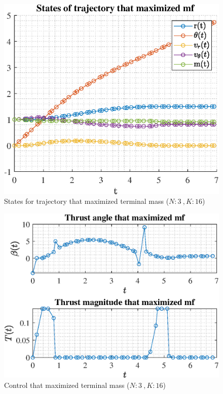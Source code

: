 \documentclass[]{article}
\begin{document}
	\begin{figure}
		\centering
		\includegraphics[scale=0.75]{states_N3_K16_C3_mf.eps}
		\caption{States for trajectory that maximized terminal mass (\(N:3\ , K:16\))}
		\label{fig:states_N3_K16_C3_mf}
	\end{figure}
	\begin{figure}
		\centering
		\includegraphics[scale=0.75]{control_N3_K16_C3_mf.eps}
		\caption{Control that maximized terminal mass (\(N:3\ , K:16\))}
		\label{fig:control_N3_K16_C3_mf}
	\end{figure}
\end{document}
